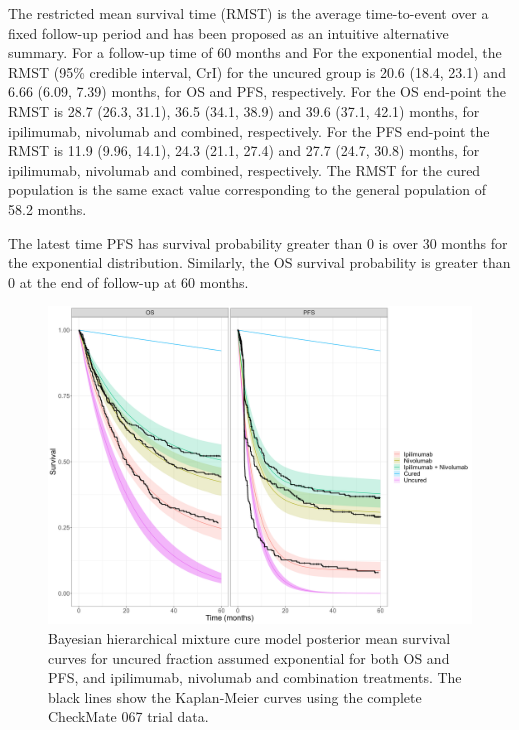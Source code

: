 \documentclass[AMA,STIX1COL]{WileyNJD-v2}
\begin{document}
The restricted mean survival time (RMST) is the average time-to-event over a fixed follow-up period and has been proposed as an intuitive alternative summary.
For a follow-up time of 60 months and For the exponential model, the RMST (95\% credible interval, CrI) for the uncured group is 20.6 (18.4, 23.1) and 6.66 (6.09, 7.39) months, for OS and PFS, respectively. 
For the OS end-point the RMST is 28.7 (26.3, 31.1), 36.5 (34.1, 38.9) and 39.6 (37.1, 42.1) months, for ipilimumab, nivolumab and combined, respectively.
For the PFS end-point the RMST is 11.9 (9.96, 14.1), 24.3 (21.1, 27.4) and 27.7 (24.7, 30.8) months, for ipilimumab, nivolumab and combined, respectively.
The RMST for the cured population is the same exact value corresponding to the general population of 58.2 months.

The latest time PFS has survival probability greater than 0 is over 30 months for the exponential distribution.
Similarly, the OS survival probability is greater than 0 at the end of follow-up at 60 months.


\begin{figure}[!ht]
\centering
\includegraphics[width=0.7\linewidth]{bmcm_stan_exp_exp_S_plot.png}
\caption{\label{fig:S_exp_cf_hier} Bayesian hierarchical mixture cure model posterior mean survival curves for uncured fraction assumed exponential for both OS and PFS, and ipilimumab, nivolumab and combination treatments. The black lines show the Kaplan-Meier curves using the complete CheckMate 067 trial data.}
\end{figure}
\end{document}
